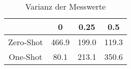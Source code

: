 \bgroup
\def\arraystretch{2}
\begin{table}[H]
	\vspace{.5cm}
	\centering		
	\begin{center}
		\begin{tabular}{|c||c|c|c|}
			\hline 
			& 0 & 0.25 & 0.5 \\
			\hline 
			\hline
			Zero-Shot & 466.9 & 199.0 & 119.3 \\
			\hline
			One-Shot & 80.1 & 213.1 & 350.6 \\
			\hline
		\end{tabular} 
	\end{center}
	\caption{Varianz der Messwerte}
	\label{fig:o-var}
	\vspace{-.8cm}
\end{table}
\egroup